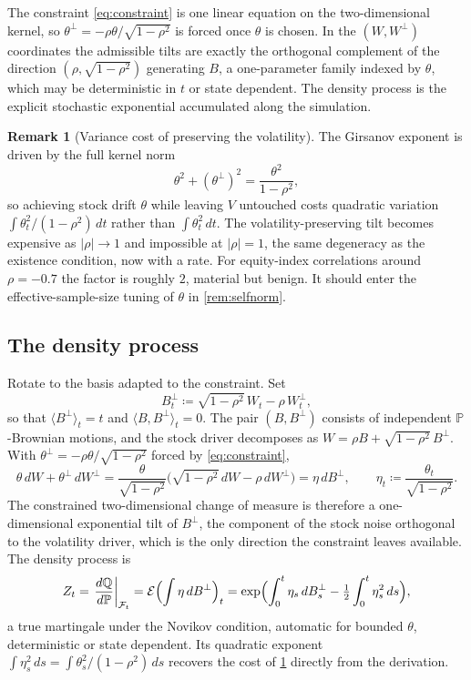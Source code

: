 \documentclass[11pt,a4paper]{article}
\theoremstyle{plain}
\theoremstyle{definition}
\theoremstyle{definition}
\newtheorem{remark}[theorem]{Remark}
\newcommand{\Pm}{\mathbb{P}}
\newcommand{\Qm}{\mathbb{Q}}
\newcommand{\abs}[1]{\left\lvert #1 \right\rvert}
\begin{document}
The constraint \cref{eq:constraint} is one linear equation on the two-dimensional kernel, so $\theta^\perp = -\rho\theta/\sqrt{1-\rho^2}$ is forced once $\theta$ is chosen. In the $(W, W^\perp)$ coordinates the admissible tilts are exactly the orthogonal complement of the direction $(\rho, \sqrt{1-\rho^2})$ generating $B$, a one-parameter family indexed by $\theta$, which may be deterministic in $t$ or state dependent. The density process is the explicit stochastic exponential accumulated along the simulation.

\begin{remark}[Variance cost of preserving the volatility]\label{rem:cost}
The Girsanov exponent is driven by the full kernel norm
  \[
    \theta^2 + (\theta^\perp)^2 = \frac{\theta^2}{1-\rho^2},
  \]
so achieving stock drift $\theta$ while leaving $V$ untouched costs quadratic variation $\int \theta_t^2/(1-\rho^2)\,dt$ rather than $\int \theta_t^2\,dt$. The volatility-preserving tilt becomes expensive as $\abs{\rho} \to 1$ and impossible at $\abs{\rho} = 1$, the same degeneracy as the existence condition, now with a rate. For equity-index correlations around $\rho = -0.7$ the factor is roughly $2$, material but benign. It should enter the effective-sample-size tuning of $\theta$ in \cref{rem:selfnorm}.
\end{remark}

\subsection{The density process}\label{subsec:density}

Rotate to the basis adapted to the constraint. Set
\[
  B^\perp_t \coloneqq \sqrt{1-\rho^2}\,W_t - \rho\,W^\perp_t ,
\]
so that $\langle B^\perp\rangle_t = t$ and $\langle B, B^\perp\rangle_t = 0$. The pair $(B, B^\perp)$ consists of independent $\Pm$-Brownian motions, and the stock driver decomposes as $W = \rho B + \sqrt{1-\rho^2}\,B^\perp$. With $\theta^\perp = -\rho\theta/\sqrt{1-\rho^2}$ forced by \cref{eq:constraint},
\[
  \theta\,dW + \theta^\perp\,dW^\perp
  = \frac{\theta}{\sqrt{1-\rho^2}}
    \bigl(\sqrt{1-\rho^2}\,dW - \rho\,dW^\perp\bigr)
  = \eta\,dB^\perp,
  \qquad
  \eta_t \coloneqq \frac{\theta_t}{\sqrt{1-\rho^2}} .
\]
The constrained two-dimensional change of measure is therefore a one-dimensional exponential tilt of $B^\perp$, the component of the stock noise orthogonal to the volatility driver, which is the only direction the constraint leaves available. The density process is
\begin{equation}\label{eq:density}
  Z_t = \left.\frac{d\Qm}{d\Pm}\right|_{\mathcal{F}_t}
      = \mathcal{E}\Bigl(\int \eta\,dB^\perp\Bigr)_t
      = \exp\Bigl( \int_0^t \eta_s\,dB^\perp_s
        - \tfrac12 \int_0^t \eta_s^2\,ds \Bigr),
\end{equation}
a true martingale under the Novikov condition, automatic for bounded $\theta$, deterministic or state dependent. Its quadratic exponent $\int \eta_s^2\,ds = \int \theta_s^2/(1-\rho^2)\,ds$ recovers the cost of \cref{rem:cost} directly from the derivation.
\end{document}
